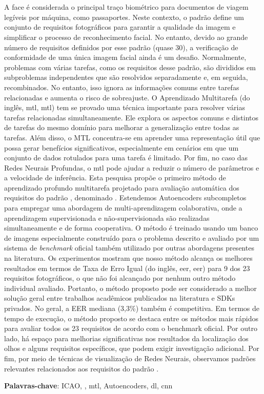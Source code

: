 \section*{}

\noindent
A face é considerada o principal traço biométrico para documentos de viagem legíveis por máquina, como passaportes. Neste contexto, o padrão \icao define um conjunto de requisitos fotográficos para garantir a qualidade da imagem e simplificar o processo de reconhecimento facial. No entanto, devido ao grande número de requisitos definidos por esse padrão (quase 30), a verificação de conformidade de uma única imagem facial ainda é um desafio. Normalmente, problemas com várias tarefas, como os requisitos desse padrão, são divididos em subproblemas independentes que são resolvidos separadamente e, em seguida, recombinados. No entanto, isso ignora as informações comuns entre tarefas relacionadas e aumenta o risco de sobreajuste. O Aprendizado Multitarefa (do inglês, \acl{mtl}, \acs{mtl}) tem se provado uma técnica importante para resolver várias tarefas relacionadas simultaneamente. Ele explora os aspectos comuns e distintos de tarefas do mesmo domínio para melhorar a generalização entre todas as tarefas. Além disso, o MTL concentra-se em aprender uma representação útil que possa gerar benefícios significativos, especialmente em cenários em que um conjunto de dados rotulados para uma tarefa é limitado. Por fim, no caso das Redes Neurais Profundas, o \acs{mtl} pode ajudar a reduzir o número de parâmetros e a velocidade de inferência. Esta pesquisa propõe o primeiro método de aprendizado profundo multitarefa projetado para avaliação automática dos requisitos do padrão \icao, denominado \methodname. Estendemos Autoencoders subcompletos para empregar uma abordagem de multi-aprendizagem colaborativa, onde a aprendizagem supervisionada e não-supervisionada são realizadas simultaneamente e de forma cooperativa. O método é treinado usando um banco de imagens especialmente construído para o problema descrito e avaliado por um sistema de \textit{benchmark} oficial também utilizado por outras abordagens presentes na literatura. Os experimentos mostram que nosso método alcança os melhores resultados em termos de Taxa de Erro Igual (do inglês, \acl{eer}, \acs{eer}) para 9 dos 23 requisitos fotográficos, o que não foi alcançado por nenhum outro método individual avaliado. Portanto, o método proposto pode ser considerado a melhor solução geral entre trabalhos acadêmicos publicados na literatura e SDKs privados. No geral, a EER mediana (3,3\%) também é competitiva. Em termos de tempo de execução, o método proposto se destaca entre os métodos mais rápidos para avaliar todos os 23 requisitos de acordo com o benchmark oficial. Por outro lado, há espaço para melhorias significativas nos resultados da localização dos olhos e alguns requisitos específicos, que podem exigir investigação adicional. Por fim, por meio de técnicas de visualização de Redes Neurais, observamos padrões relevantes relacionados aos requisitos do padrão \icao.

\vspace{1em}

\noindent
\textbf{Palavras-chave}: ICAO, \icao, \acl{mtl}, Autoencoders, \acl{dl}, \acl{cnn}

\newpage
